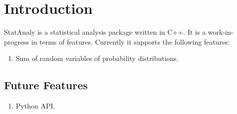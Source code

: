 \chapter{Introduction}
\label{ch:intro}

StatAnaly is a statistical analysis package written in C++. It is a work-in-progress in terms of features. Currently it supports the following features:

\begin{enumerate}
    \item Sum of random variables of probability distributions.
\end{enumerate}


\section{Future Features} 

\begin{enumerate}
    \item Python API.
\end{enumerate}
